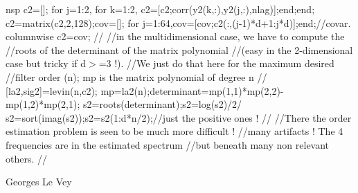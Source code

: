 \begin{examples}
\begin{mintednsp}{nsp}
    c2=[];
    for j=1:2, for k=1:2, c2=[c2;corr(y2(k,:),y2(j,:),nlag)];end;end;
    c2=matrix(c2,2,128);cov=[];
    for j=1:64,cov=[cov;c2(:,(j-1)*d+1:j*d)];end;//covar. columnwise
    c2=cov;
    //
    //in the multidimensional case, we have to compute the 
    //roots of the determinant of the matrix polynomial 
    //(easy in the 2-dimensional case but tricky if d$>$=3 !). 
    //We just do that here for the maximum desired 
    //filter order (n); mp is the matrix polynomial of degree n
    //
    [la2,sig2]=levin(n,c2);
    mp=la2(n);determinant=mp(1,1)*mp(2,2)-mp(1,2)*mp(2,1);
    s2=roots(determinant);s2=log(s2)/2/%
    s2=sort(imag(s2));s2=s2(1:d*n/2);//just the positive ones !
    //
    //There the order estimation problem is seen to be much more difficult !
    //many artifacts ! The 4 frequencies are in the estimated spectrum 
    //but beneath many non relevant others.
    //
  \end{mintednsp}
\end{examples}
\begin{manseealso}
\end{manseealso}
\begin{authors}
  Georges Le Vey
\end{authors}
